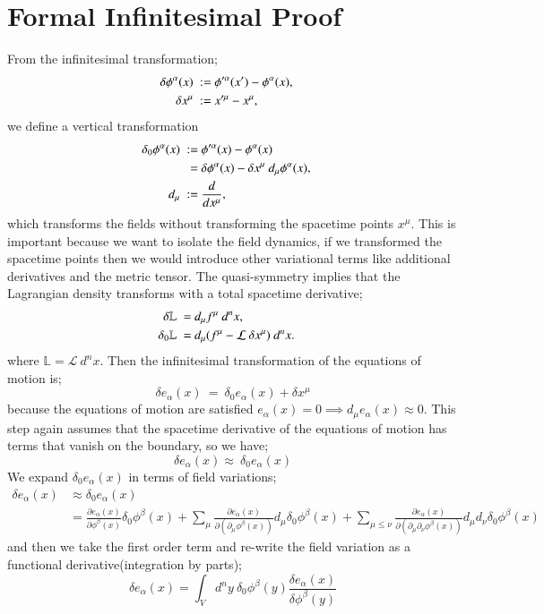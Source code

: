 \documentclass{article}
\begin{document}
\section{Formal Infinitesimal Proof}
From the infinitesimal transformation;
\begin{align}  \delta \phi^{\alpha}(x)~:=~&\phi^{\prime \alpha}(x^{\prime})-\phi^{\alpha}(x), \cr
\delta x^{\mu}~:=~&x^{\prime \mu}-x^{\mu},\end{align}
we define a vertical transformation
\begin{align}  \delta_0 \phi^{\alpha}(x)~:=~&\phi^{\prime \alpha}(x)-\phi^{\alpha}(x)\cr
~=~&\delta \phi^{\alpha}(x)-\delta x^{\mu} ~d_{\mu}\phi^{\alpha}(x),\cr
d_{\mu}~:=~&\frac{d}{dx^{\mu}},\end{align}
which transforms the fields without transforming the spacetime points $x^\mu$. This is important because we want to isolate the field dynamics, if we transformed the spacetime points then we would introduce other variational terms like additional derivatives and the metric tensor. The quasi-symmetry implies that the Lagrangian density transforms with a total spacetime derivative;
\begin{align}  \delta \mathbb{L}~=~&d_{\mu} f^{\mu}~d^nx, \cr
\delta_0 \mathbb{L}~=~&d_{\mu}(f^{\mu}-{\cal L}~\delta x^{\mu})~d^nx.\end{align}
	where $\mathbb{L} = \mathcal{L}\ d^nx$. Then the infinitesimal transformation of the equations of motion is;
\[
	\delta e_{\alpha}(x)~=~\delta_0 e_{\alpha}(x) + \delta x^{\mu}
\]
because the equations of motion are satisfied $e_\alpha(x) = 0 \implies d_\mu e_\alpha(x) \approx 0$. This step again assumes that the spacetime derivative of the equations of motion has terms that vanish on the boundary, so we have;
\[
	\delta e_{\alpha}(x)\approx~\delta_0 e_{\alpha}(x)
\]
We expand $\delta_0 e_\alpha(x)$ in terms of field variations;
\begin{align*}
	\delta e_\alpha(x) &\approx \delta_0 e_\alpha(x) \\
	&= \frac{\partial e_{\alpha}(x)}{\partial\phi^{\beta}(x)}\delta_0\phi^{\beta}(x) +\sum_{\mu}\frac{\partial e_{\alpha}(x)}{\partial(\partial_{\mu}\phi^{\beta}(x))}d_{\mu}\delta_0\phi^{\beta}(x) +\sum_{\mu\leq \nu }\frac{\partial e_{\alpha}(x)}{\partial(\partial_{\mu}\partial_{\nu}\phi^{\beta}(x))}d_{\mu}d_{\nu}\delta_0\phi^{\beta}(x)
\end{align*}
and then we take the first order term and re-write the field variation as a functional derivative(integration by parts);
\[
	\delta e_\alpha(x) = \int_V\! d^ny~ \delta_0\phi^{\beta}(y)\frac{\delta e_{\alpha}(x)}{\delta \phi^{\beta}(y)}
\]
\end{document}
